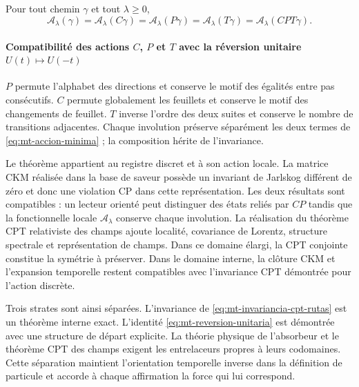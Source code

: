 \begin{resultado}[title={Théorème : Invariance discrète individuelle et conjointe}]
\label{thm:mt-cpt-rutas}
Pour tout chemin $\gamma$ et tout $\lambda\geq0$,
\begin{equation}
 \mathcal A_\lambda(\gamma)
 =\mathcal A_\lambda(C\gamma)
 =\mathcal A_\lambda(P\gamma)
 =\mathcal A_\lambda(T\gamma)
 =\mathcal A_\lambda(CPT\gamma).
 \label{eq:mt-invariancia-cpt-rutas}
\end{equation}
\end{resultado}

\paragraph{Compatibilité des actions \(C\), \(P\) et \(T\) avec la réversion unitaire \(U(t)\mapsto U(-t)\)}
$P$ permute l'alphabet des directions et conserve le motif des égalités
entre pas consécutifs. $C$ permute globalement les feuillets et conserve le
motif des changements de feuillet. $T$ inverse l'ordre des deux suites et
conserve le nombre de transitions adjacentes. Chaque involution préserve
séparément les deux termes de
\eqref{eq:mt-accion-minima} ; la composition hérite de l'invariance.


Le théorème appartient au registre discret et à son action locale. La matrice CKM
réalisée dans la base de saveur possède un invariant de Jarlskog différent de
zéro et donc une violation CP dans cette représentation. Les deux résultats sont
compatibles : un lecteur orienté peut distinguer des états reliés par
$CP$ tandis que la fonctionnelle locale
$\mathcal A_\lambda$ conserve chaque involution. La
réalisation du théorème CPT relativiste des champs ajoute localité,
covariance de Lorentz, structure spectrale et représentation de champs. Dans
ce domaine élargi, la CPT conjointe constitue la symétrie à préserver. Dans le
domaine interne, la clôture CKM et l'expansion temporelle restent compatibles
avec l'invariance CPT démontrée pour l'action discrète.

Trois strates sont ainsi séparées. L'invariance de
\eqref{eq:mt-invariancia-cpt-rutas} est un théorème interne exact. L'identité
\eqref{eq:mt-reversion-unitaria} est démontrée avec une structure de départ
explicite. La théorie physique de l'absorbeur et le théorème CPT des champs exigent
les entrelaceurs propres à leurs codomaines. Cette séparation maintient
l'orientation temporelle inverse dans la définition de particule et accorde
à chaque affirmation la force qui lui correspond.

